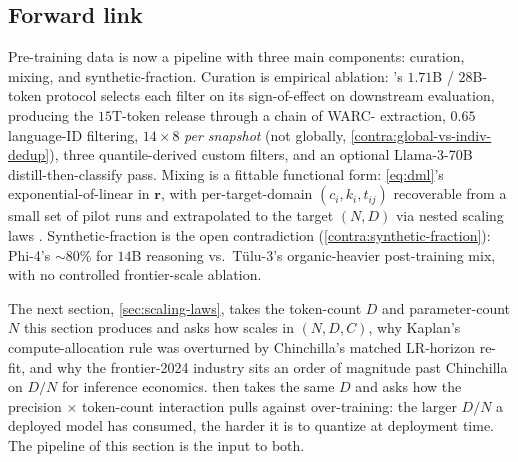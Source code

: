 \subsection{Forward link}
\label{sec:data-forward}

Pre-training data is now a pipeline with three main components:
curation, mixing, and synthetic-fraction. Curation is empirical
ablation: \citet{fineweb2024}'s $1.71$B / $28$B-token protocol
selects each filter on its sign-of-effect on downstream evaluation,
producing the $15$T-token  release through a chain of
WARC- extraction, $0.65$ language-ID filtering, $14
\times 8$  \emph{per snapshot} (not globally,
\cref{contra:global-vs-indiv-dedup}), three quantile-derived custom
filters, and an optional Llama-3-70B distill-then-classify pass.
Mixing is a fittable functional form: \cref{eq:dml}'s
exponential-of-linear in $\mathbf{r}$, with per-target-domain
$(c_i, k_i, t_{ij})$ recoverable from a small set of pilot runs and
extrapolated to the target $(N, D)$ via nested scaling laws
\citep{data-mixing-laws-2024}. Synthetic-fraction is the open
contradiction (\cref{contra:synthetic-fraction}): Phi-4's
$\sim\!80\%$ for $14$B reasoning vs.\ Tülu-3's organic-heavier
post-training mix, with no controlled frontier-scale ablation.

The next section, \cref{sec:scaling-laws}, takes the token-count $D$
and parameter-count $N$ this section produces and asks how
 scales in $(N, D, C)$, why Kaplan's
compute-allocation rule was overturned by Chinchilla's matched
LR-horizon re-fit, and why the frontier-2024 industry sits an order
of magnitude past Chinchilla on $D / N$ for inference economics.
 then takes the same $D$ and asks how the
precision $\times$ token-count interaction \citep[\S
4]{scaling-laws-precision-2024} pulls against over-training: the
larger $D / N$ a deployed model has consumed, the harder it is to
quantize at deployment time. The pipeline of this section is the
input to both.
